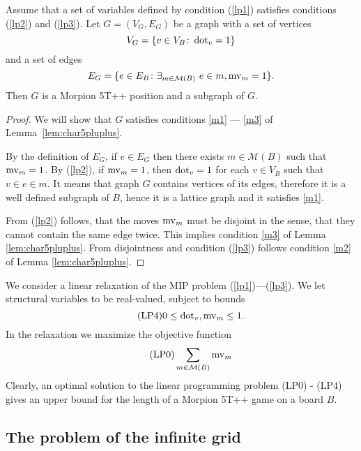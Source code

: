 \begin{lemma} Assume that a set of variables defined by condition (\ref{lp1}) satisfies conditions (\ref{lp2}) and (\ref{lp3}).
Let $G = (V_G, E_G)$ be a graph with a set of vertices
\[
  V_G = \{ v \in V_B \colon \operatorname{dot}_v = 1 \}
\]
and a set of edges
\[
  E_G = \{ e \in E_B \colon \exists_{m \in \mathcal{M}(B)}\ e \in m, \operatorname{mv}_m = 1 \}.
\]
Then $G$ is a Morpion 5T++ position and a subgraph of $G$. 
\end{lemma}
\begin{proof}
We will show that $G$ satisfies conditions \ref{m1} --- \ref{m3} of Lemma~\ref{lem:char5pluplus}.

By the definition of $E_G$, if $e \in E_G$ then there exists $m \in \mathcal{M}(B)$ such that $\operatorname{mv}_m = 1$.
By (\ref{lp2}), if $\operatorname{mv}_m = 1$, then $\operatorname{dot}_v = 1$ for each $v \in V_B$ such that $v \in e \in m$. It means that graph $G$ contains vertices of its edges, therefore it is a well defined subgraph of $B$, hence it is a lattice graph and it satisfies \ref{m1}. 

From (\ref{lp2}) follows, that the moves $\operatorname{mv}_m$ must be disjoint in the sense, that they cannot contain the same edge twice. This implies condition \ref{m3} of Lemma \ref{lem:char5pluplus}. From disjointness and condition (\ref{lp3}) follows condition \ref{m2} of Lemma \ref{lem:char5pluplus}.
\end{proof}


We consider a linear relaxation of the MIP problem (\ref{lp1})---(\ref{lp3}). We let structural variables to be real-valued, subject to bounds
\begin{equation}
  \tag{LP4} 0 \leq \operatorname{dot}_v, \operatorname{mv}_m \leq 1.
  \label{lp4}
\end{equation}
\noindent
In the relaxation we maximize the objective function 
\begin{equation}
  \tag{LP0} \sum_{m \in \mathcal{M}(B)}  \move_m  %
  \label{lp0}
\end{equation}%
Clearly, an optimal solution to the linear programming problem (LP0) - (LP4) gives an upper bound for the length of a Morpion 5T++ game on a board $B$.

\subsection{The problem of the infinite grid}
\label{inf_grid}

